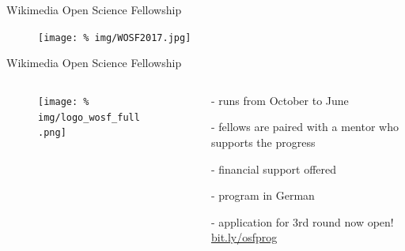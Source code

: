

\begin{frame}{Wikimedia Open Science Fellowship}

  \begin{figure}
    \centering
    \texttt{[image: \%
    img/WOSF2017.jpg]} %
  \end{figure}
  



\end{frame}




\begin{frame}{Wikimedia Open Science Fellowship}

  \begin{columns}
    \begin{column}{.55\textwidth}


      \begin{figure}
        \centering
        \texttt{[image: \%
        img/logo\_wosf\_full.png]} %
      \end{figure}
      

      
      

    \end{column}
    \begin{column}{.45\textwidth}
      \minipage[c][0.625\textheight][s]{\columnwidth}

      \vspace{0.2cm}
      
      \begin{itemize}[leftmargin=*]

      \item[-] runs from October to June

      \item[-] fellows are paired with a mentor who supports the progress

      \item[-] financial support offered

      \item[-] program in German

      \item[-]       application for 3rd round now open!
      \href{http://bit.ly/osfprog}{bit.ly/osfprog}


      \end{itemize}

      

      \endminipage      
    \end{column}
  \end{columns}
  
\end{frame}

